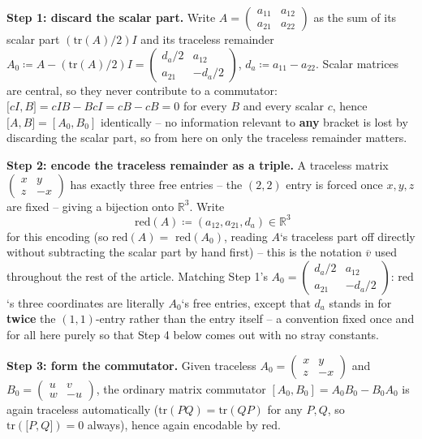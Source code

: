 \documentclass[a4paper,11pt]{scrartcl}
\begin{document}
\textbf{Step 1: discard the scalar part.} Write \(A = \begin{pmatrix}
a_{11} & a_{12} \\
a_{21} & a_{22}
\end{pmatrix}\) as the sum of its scalar part \(\left( \text{tr}(A)/2 \right)I\) and its traceless remainder \(A_{0} ≔ A - \left( \text{tr}(A)/2 \right)I = \begin{pmatrix}
d_{a}/2 & a_{12} \\
a_{21} & - d_{a}/2
\end{pmatrix}\), \(d_{a} ≔ a_{11} - a_{22}\). Scalar matrices are central, so they never contribute to a commutator: \(\lbrack cI,B\rbrack = cIB - BcI = cB - cB = 0\) for every \(B\) and every scalar \(c\), hence \(\lbrack A,B\rbrack = \left\lbrack A_{0},B_{0} \right\rbrack\) identically -- no information relevant to \textbf{any} bracket is lost by discarding the scalar part, so from here on only the traceless remainder matters.

\textbf{Step 2: encode the traceless remainder as a triple.} A traceless matrix \(\begin{pmatrix}
x & y \\
z & - x
\end{pmatrix}\) has exactly three free entries -- the \((2,2)\) entry is forced once \(x,y,z\) are fixed -- giving a bijection onto \(\mathbb{R}^{3}\). Write \[\text{ red}(A) ≔ \left( a_{12},a_{21},d_{a} \right) \in \mathbb{R}^{3}\] for this encoding (so \(\text{red}(A) = \text{ red}\left( A_{0} \right)\), reading \(A\)`s traceless part off directly without subtracting the scalar part by hand first) -- this is the notation \(\overline{v}\) used throughout the rest of the article. Matching Step 1's \(A_{0} = \begin{pmatrix}
d_{a}/2 & a_{12} \\
a_{21} & - d_{a}/2
\end{pmatrix}\): \(\text{red}\)`s three coordinates are literally \(A_{0}\)`s free entries, except that \(d_{a}\) stands in for \textbf{twice} the \((1,1)\)-entry rather than the entry itself -- a convention fixed once and for all here purely so that Step 4 below comes out with no stray constants.

\textbf{Step 3: form the commutator.} Given traceless \(A_{0} = \begin{pmatrix}
x & y \\
z & - x
\end{pmatrix}\) and \(B_{0} = \begin{pmatrix}
u & v \\
w & - u
\end{pmatrix}\), the ordinary matrix commutator \(\left\lbrack A_{0},B_{0} \right\rbrack = A_{0}B_{0} - B_{0}A_{0}\) is again traceless automatically (\(\text{tr}(PQ) = \text{tr}(QP)\) for any \(P,Q\), so \(\text{tr}\left( \lbrack P,Q\rbrack \right) = 0\) always), hence again encodable by \(\text{red}\).
\end{document}
